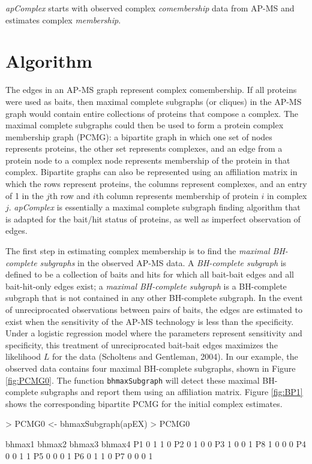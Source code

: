\documentclass[11pt]{article}
\newcommand{\Rfunction}[1]{{\texttt{#1}}}
\newcommand{\Rpackage}[1]{{\textit{#1}}}
\begin{document}
\Rpackage{apComplex} starts with observed complex \textit{comembership} data
from AP-MS and estimates complex \textit{membership}.

\section*{Algorithm}

The edges in an AP-MS graph represent complex comembership.  If all proteins
were used as baits, then maximal
complete subgraphs (or cliques) in the AP-MS graph would contain entire collections of proteins that
compose a complex.  The maximal complete subgraphs could then be used to form a protein complex
membership graph (PCMG): a bipartite graph in which one set of nodes
represents proteins, the other set represents complexes, and an edge from a
protein node to a complex node represents membership of the protein in that
complex.  Bipartite graphs can also be represented using an affiliation
matrix in which the rows represent proteins, the columns represent
complexes, and an entry of 1 in the $j$th row and $i$th column represents
membership of protein $i$ in complex $j$.  \Rpackage{apComplex} is essentially a maximal complete
subgraph finding algorithm that is adapted for the bait/hit status of
proteins, as well as imperfect observation of edges.

The first step in estimating complex membership is to find the \textit{maximal
BH-complete subgraphs} in the observed AP-MS data.  A \textit{BH-complete
subgraph} is defined to be a collection of baits and hits for which all bait-bait edges and
all bait-hit-only edges exist; a \textit{maximal BH-complete subgraph} is a
BH-complete subgraph that is not contained in any other BH-complete subgraph.  In the event of unreciprocated observations
between pairs of baits, the edges are estimated to exist when the sensitivity
of the AP-MS technology is less than the specificity.  Under a logistic
regression model where the parameters represent sensitivity and specificity, this treatment of unreciprocated bait-bait edges
maximizes the likelihood $L$ for the data (Scholtens and Gentleman, 2004).  In our example, the observed data contains four maximal
BH-complete subgraphs, shown in Figure \ref{fig:PCMG0}.  The function
\Rfunction{bhmaxSubgraph} will detect these maximal BH-complete subgraphs and
report them using an affiliation matrix.  Figure \ref{fig:BP1}
shows the corresponding bipartite PCMG for the initial complex estimates.

\begin{Schunk}
\begin{Sinput}
> PCMG0 <- bhmaxSubgraph(apEX)
> PCMG0
\end{Sinput}
\begin{Soutput}
   bhmax1 bhmax2 bhmax3 bhmax4
P1      0      1      1      0
P2      0      1      0      0
P3      1      0      0      1
P8      1      0      0      0
P4      0      0      1      1
P5      0      0      0      1
P6      0      1      1      0
P7      0      0      0      1
\end{Soutput}
\end{Schunk}
\end{document}
